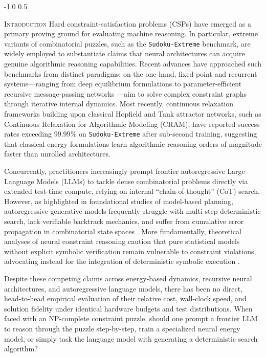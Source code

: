 \documentclass{article} %
\makeatletter
\renewcommand{\section}{\@startsection{section}{1}{\z@}%
  {-1.0\baselineskip}%
  {0.5\baselineskip}%
  {\normalfont\fontsize{12pt}{14pt}\selectfont\scshape\raggedright}}
\makeatother
\begin{document}
\section{\textsc{Introduction}}
\label{sec:intro}
Hard constraint-satisfaction problems (CSPs) have emerged as a primary proving ground for evaluating machine reasoning. In particular, extreme variants of combinatorial puzzles, such as the \texttt{Sudoku-Extreme} benchmark, are widely employed to substantiate claims that neural architectures can acquire genuine algorithmic reasoning capabilities. Recent advances have approached such benchmarks from distinct paradigms: on the one hand, fixed-point and recurrent systems—ranging from deep equilibrium formulations \citep{Bai2019DeepEquilibrium} to parameter-efficient recursive message-passing networks \citep{Salvatori2026TinyRecursive}—aim to solve complex constraint graphs through iterative internal dynamics. Most recently, continuous relaxation frameworks building upon classical Hopfield and Tank attractor networks, such as Continuous Relaxation for Algorithmic Modeling (CRAM), have reported success rates exceeding $99.99\%$ on \texttt{Sudoku-Extreme} after sub-second training, suggesting that classical energy formulations learn algorithmic reasoning orders of magnitude faster than unrolled architectures.

Concurrently, practitioners increasingly prompt frontier autoregressive Large Language Models (LLMs) to tackle dense combinatorial problems directly via extended test-time compute, relying on internal ``chain-of-thought'' (CoT) search. However, as highlighted in foundational studies of model-based planning, autoregressive generative models frequently struggle with multi-step deterministic search, lack verifiable backtrack mechanics, and suffer from cumulative error propagation in combinatorial state spaces \citep{Valmeekam2023PlanningAbilities}. More fundamentally, theoretical analyses of neural constraint reasoning caution that pure statistical models without explicit symbolic verification remain vulnerable to constraint violations, advocating instead for the integration of deterministic symbolic execution \citep{Kong2026PositionCertified}.

Despite these competing claims across energy-based dynamics, recursive neural architectures, and autoregressive language models, there has been no direct, head-to-head empirical evaluation of their relative cost, wall-clock speed, and solution fidelity under identical hardware budgets and test distributions. When faced with an NP-complete constraint puzzle, should one prompt a frontier LLM to reason through the puzzle step-by-step, train a specialized neural energy model, or simply task the language model with generating a deterministic search algorithm?
\end{document}
